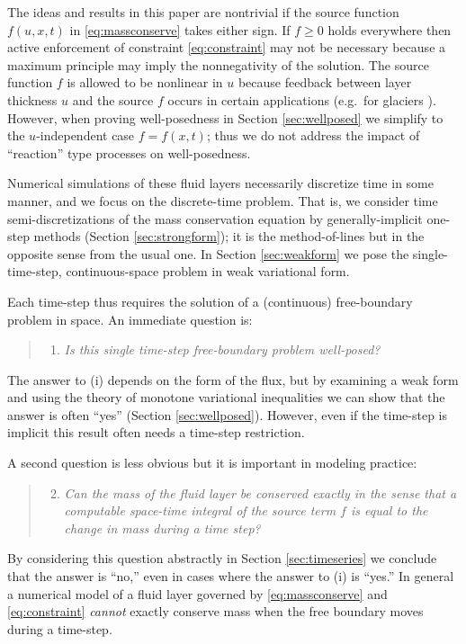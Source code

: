 \documentclass[final,onefignum]{siamart190516}
\begin{document}
The ideas and results in this paper are nontrivial if the source function $f(u,x,t)$ in \eqref{eq:massconserve} takes either sign.  If $f\ge 0$ holds everywhere then active enforcement of constraint \eqref{eq:constraint} may not be necessary because a maximum principle may imply the nonnegativity of the solution.  The source function $f$ is allowed to be nonlinear in $u$ because feedback between layer thickness $u$ and the source $f$ occurs in certain applications (e.g.~for glaciers \cite{Jouvetetal2011}).  However, when proving well-posedness in Section \ref{sec:wellposed} we simplify to the $u$-independent case $f=f(x,t)$; thus we do not address the impact of ``reaction'' type processes on well-posedness.

Numerical simulations of these fluid layers necessarily discretize time in some manner, and we focus on the discrete-time problem.  That is, we consider time semi-discretizations of the mass conservation equation by generally-implicit one-step methods (Section \ref{sec:strongform}); it is the method-of-lines but in the opposite sense from the usual one.  In Section \ref{sec:weakform} we pose the single-time-step, continuous-space problem in weak variational form.

Each time-step thus requires the solution of a (continuous) free-boundary problem in space.  An immediate question is:
  \begin{quote}
  \renewcommand{\labelenumi}{(\roman{enumi})}
  \begin{enumerate}
  \item \emph{Is this single time-step free-boundary problem well-posed?}
  \end{enumerate}
  \end{quote}
The answer to (i) depends on the form of the flux, but by examining a weak form and using the theory of monotone variational inequalities \cite{KinderlehrerStampacchia1980} we can show that the answer is often ``yes'' (Section \ref{sec:wellposed}).  However, even if the time-step is implicit this result often needs a time-step restriction.

A second question is less obvious but it is important in modeling practice:
  \begin{quote}
  \renewcommand{\labelenumi}{(\roman{enumi})}
  \begin{enumerate}
  \setcounter{enumi}{1}
  \item \emph{Can the mass of the fluid layer be conserved exactly in the sense that a computable space-time integral of the source term $f$ is equal to the change in mass during a time step?}
  \end{enumerate}
  \end{quote}
By considering this question abstractly in Section \ref{sec:timeseries} we conclude that the answer is ``no,'' even in cases where the answer to (i) is ``yes.''  In general a numerical model of a fluid layer governed by \eqref{eq:massconserve} and \eqref{eq:constraint} \emph{cannot} exactly conserve mass when the free boundary moves during a time-step.
\end{document}
